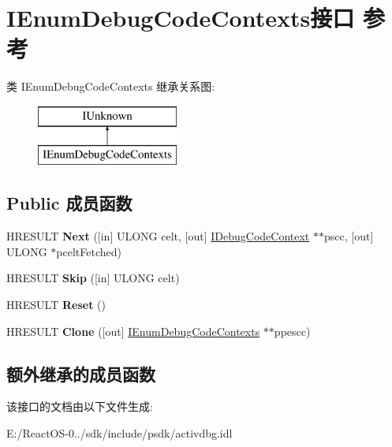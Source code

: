 \hypertarget{interface_i_enum_debug_code_contexts}{}\section{I\+Enum\+Debug\+Code\+Contexts接口 参考}
\label{interface_i_enum_debug_code_contexts}
类 I\+Enum\+Debug\+Code\+Contexts 继承关系图\+:\begin{figure}[H]
\begin{center}
\leavevmode
\includegraphics[height=2.000000cm]{interface_i_enum_debug_code_contexts}
\end{center}
\end{figure}
\subsection*{Public 成员函数}
\begin{DoxyCompactItemize}
\item 
\mbox{\label{interface_i_enum_debug_code_contexts_a6d5d4a589c4cb1584d84f535bdc83a85}} 
H\+R\+E\+S\+U\+LT {\bfseries Next} (\mbox{[}in\mbox{]} U\+L\+O\+NG celt, \mbox{[}out\mbox{]} \hyperlink{interface_i_debug_code_context}{I\+Debug\+Code\+Context} $\ast$$\ast$pscc, \mbox{[}out\mbox{]} U\+L\+O\+NG $\ast$pcelt\+Fetched)
\item 
\mbox{\label{interface_i_enum_debug_code_contexts_a5abd778ff3eea82096623da0de542530}} 
H\+R\+E\+S\+U\+LT {\bfseries Skip} (\mbox{[}in\mbox{]} U\+L\+O\+NG celt)
\item 
\mbox{\label{interface_i_enum_debug_code_contexts_ae733067e885d96373d845e0fdd38dfe5}} 
H\+R\+E\+S\+U\+LT {\bfseries Reset} ()
\item 
\mbox{\label{interface_i_enum_debug_code_contexts_a1908fb6fb82506116e66973b581078f3}} 
H\+R\+E\+S\+U\+LT {\bfseries Clone} (\mbox{[}out\mbox{]} \hyperlink{interface_i_enum_debug_code_contexts}{I\+Enum\+Debug\+Code\+Contexts} $\ast$$\ast$ppescc)
\end{DoxyCompactItemize}
\subsection*{额外继承的成员函数}


该接口的文档由以下文件生成\+:\begin{DoxyCompactItemize}
\item 
E\+:/\+React\+O\+S-\/0../sdk/include/psdk/activdbg.\+idl\end{DoxyCompactItemize}

